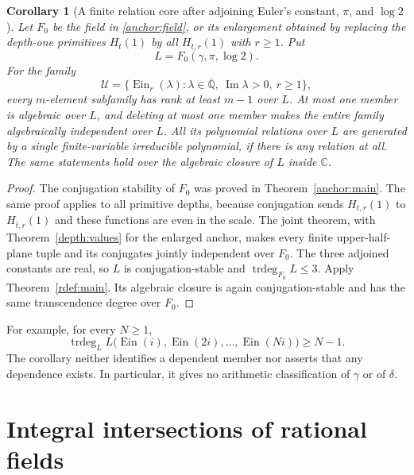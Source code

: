 \documentclass[11pt]{article}
\newtheorem{corollary}[theorem]{Corollary}
\theoremstyle{definition}
\theoremstyle{remark}
\newcommand{\Ein}{\operatorname{Ein}}
\begin{document}
\begin{corollary}[A finite relation core after adjoining
Euler's constant, $\pi$, and $\log2$]\label{rdef:upper}
Let $F_0$ be the field in \eqref{anchor:field}, or its enlargement
obtained by replacing the depth-one primitives $H_t(1)$ by all
$H_{t,r}(1)$ with $r\ge1$. Put
\[
                         L=F_0(\gamma,\pi,\log2).
\]
For the family
\[
 \mathcal U=\{\Ein_r(\lambda):
       \lambda\in\overline{\mathbb Q},\ \operatorname{Im}\lambda>0,
       \ r\ge1\},
\]
every $m$-element subfamily has rank at least $m-1$ over $L$.
At most one member is algebraic over $L$, and deleting at most one
member makes the entire family algebraically independent over $L$.
All its polynomial relations over $L$ are generated by a single
finite-variable irreducible polynomial, if there is any relation at all.
The same statements hold over the algebraic closure of $L$ inside
$\mathbb C$.
\end{corollary}
\begin{proof}
The conjugation stability of $F_0$ was proved in
Theorem~\ref{anchor:main}. The same proof applies to all primitive
depths, because conjugation sends $H_{t,r}(1)$ to
$H_{\overline t,r}(1)$ and these functions are even in the scale.
The joint theorem, with Theorem~\ref{depth:values} for the enlarged
anchor, makes every finite upper-half-plane tuple and its conjugates
jointly independent over $F_0$. The three adjoined constants are real,
so $L$ is conjugation-stable and
$\operatorname{trdeg}_{F_0}L\le3$. Apply
Theorem~\ref{rdef:main}. Its algebraic closure is again conjugation-stable
and has the same transcendence degree over $F_0$.
\end{proof}

For example, for every $N\ge1$,
\[
 \operatorname{trdeg}_L L\bigl(\Ein(i),\Ein(2i),\ldots,\Ein(Ni)\bigr)
       \ge N-1.
\]
The corollary neither identifies a dependent member nor asserts that
any dependence exists. In particular, it gives no arithmetic
classification of $\gamma$ or of $\delta$.

\part{Integral intersections of rational fields}
\end{document}
